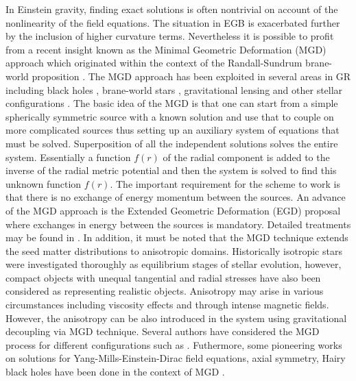 \documentclass[]{aastex631}
\begin{document}
In Einstein gravity, finding exact solutions is often nontrivial on account of the nonlinearity of the field equations. The situation in EGB is exacerbated further by the inclusion of higher curvature terms. Nevertheless it is possible to profit from a recent insight known as the Minimal Geometric Deformation (MGD) approach which originated within the context of the Randall-Sundrum \citep{randall1,randall2} brane-world proposition \citep{Ovalle2013}. The MGD approach has been exploited in several areas in GR including black holes \citep{casadio,ovalle1, Contreras2018,Contreras2019,Rincon2020}, brane-world stars \citep{ovalle,casadio1}, gravitational lensing \citep{cavalcanti} and other stellar configurations \citep{casadio2,rocha1,rocha2}. The basic idea of the MGD is that one can start from a simple spherically symmetric source with a known solution and use that to couple on more complicated sources thus setting up an auxiliary system of equations that must be solved. Superposition of all the independent solutions solves the entire system. Essentially a function $f(r)$ of the radial component is added to the inverse of the radial metric potential and then the system is solved to find this unknown function $f(r)$.  The important requirement for the scheme to work is that there is no exchange of energy momentum between the sources. An advance of the MGD approach is the Extended Geometric Deformation (EGD) proposal where exchanges in energy between the sources is mandatory. Detailed treatments may be found in  \cite{ovalle3,sharif1,sharif2,Maurya2019,Maurya2020,Maurya11,Maurya12}.  In addition, it must be noted that the MGD technique extends the seed matter distributions to anisotropic domains. Historically isotropic stars were investigated thoroughly as equilibrium stages of stellar evolution, however, compact objects with unequal tangential and radial stresses have also been considered as representing realistic objects. Anisotropy may arise in various circumstances including viscosity effects and through intense magnetic fields. However, the anisotropy can be also introduced in the system using gravitational decoupling via MGD technique. Several authors have considered the MGD process for different configurations such as \cite{Maurya2020a,Maurya2020b,Maurya2021,Ortiz2020,Contreras2020,Abell2020,Rincon11,Zubair2020,Zubair2021,Sharif2020}. Futhermore, some pioneering works on solutions for Yang-Mills-Einstein-Dirac field equations, axial symmetry, Hairy black holes have been done in the context of MGD \citep{Ovalleprd1,Ovalleprd2,Ovalleprd3}. 
\end{document}
